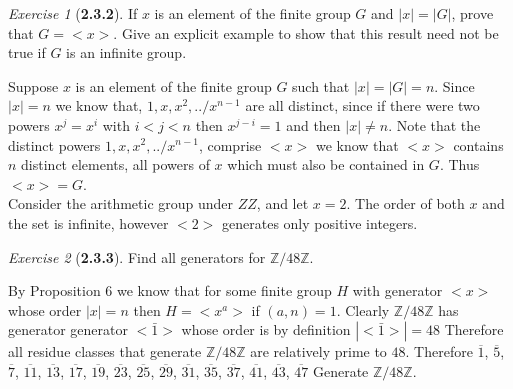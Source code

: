 \documentclass[12pt]{amsart}
\makeatletter
\theoremstyle{remark}
\newtheorem*{exercise}{Exercise}%
\def\ZZ{\ensuremath{\mathbb Z}}
\renewenvironment{proof}[1][\proofname]{\par\doublespacing
  \pushQED{\qed}%
  \normalfont \topsep6\p@\@plus6\p@\relax
  \list{}{%
    \settowidth{\leftmargin}{\itshape\proofname:\hskip\labelsep}%
    \setlength{\labelwidth}{0pt}%
    \setlength{\itemindent}{-\leftmargin}%
  }%
  \item[\hskip\labelsep\itshape#1\@addpunct{:}]\ignorespaces
}{%
  \popQED\endlist\@endpefalse
  \singlespacing
}
\theoremstyle{mycomment}
\makeatother
\begin{document}
\begin{exercise}[\textbf{2.3.2}] If $x$ is an element of the finite group $G$ and $|x| = |G|$, prove that $G = <x>$. Give an explicit example to show that this result 
  need not be true if $G$ is an infinite group.
  \begin{proof} Suppose $x$ is an element of the finite group $G$ such that $|x| = |G| = n$. Since $|x| = n$ we know that, $1, x, x^2, ../
    x^{n-1}$ are all distinct, since if there were two powers $x^j = x^i$ with $i < j < n$ then $x^{j - i} = 1$ and then $|x| \neq n$. Note that the 
    distinct powers $1, x, x^2, ../ x^{n-1}$, comprise $<x>$ we know that $<x>$ contains $n$ distinct elements, all powers of $x$ which must also be contained in $G$. Thus $<x> = G$.\\
    Consider the arithmetic group under $ZZ$, and let $x = 2$. The order of both $x$ and the set is infinite, however $<2>$ generates only positive integers.  
  \end{proof}
\end{exercise}
\vspace{.15in}




\begin{exercise}[\textbf{2.3.3}] Find all generators for $\ZZ/48\ZZ$. 
  \begin{proof}[Solutions:] By Proposition 6 we know that for some finite group $H$ with generator 
    $<x>$ whose order $|x| = n$ then $H = <x^a>$ if $(a, n) = 1$. Clearly $\ZZ/48\ZZ$ has generator
    generator $<\bar{1}>$ whose order is by definition $|<\bar{1}>| = 48$ Therefore all residue classes that generate 
    $\ZZ/48\ZZ$ are relatively prime to $48$. Therefore 
    $\overline{1}$, $   \overline{  5}$, $   \overline{  7}$, $   \overline{ 11}$, $   
    \overline{ 13}$, $   \overline{ 17}$, $   \overline{ 19}$, $   \overline{ 23}$, $   
    \overline{25}$, $   \overline{ 29}$, $   \overline{ 31}$, $   \overline{ 35}$, $   
    \overline{ 37}$, $   \overline{ 41}$, $   \overline{ 43}$, $   \overline{ 47}$
    Generate $\ZZ/48\ZZ$.
    \end{proof}
\end{exercise}
\vspace{.15in}
\end{document}
